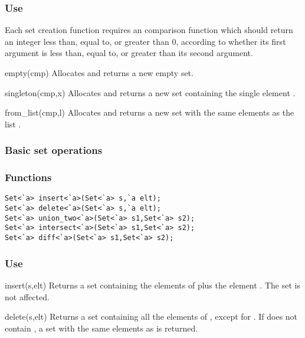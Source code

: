 \subsubsection*{Use}

Each set creation function requires an comparison function 
which should return an integer less than, equal to, or greater than 0,
according to whether its first argument is less than, equal to, or
greater than its second argument.

\begin{defun}{empty}{(cmp)}
Allocates and returns a new empty set.
\end{defun}

\begin{defun}{singleton}{(cmp,x)}
Allocates and returns a new set containing the single element .
\end{defun}

\begin{defun}{from_list}{(cmp,l)}
Allocates and returns a new set with the same elements as the list
.
\end{defun}

\subsubsection*{Basic set operations}
\subsubsection*{Functions}
\begin{verbatim}
Set<`a> insert<`a>(Set<`a> s,`a elt);
Set<`a> delete<`a>(Set<`a> s,`a elt);
Set<`a> union_two<`a>(Set<`a> s1,Set<`a> s2);
Set<`a> intersect<`a>(Set<`a> s1,Set<`a> s2);
Set<`a> diff<`a>(Set<`a> s1,Set<`a> s2);
\end{verbatim}

\subsubsection*{Use}

\begin{defun}{insert}{(s,elt)}
Returns a set containing the elements of  plus the element
.  The set  is not affected.
\end{defun}

\begin{defun}{delete}{(s,elt)}
Returns a set containing all the elements of , except for
.  If  does not contain , a set with the same
elements as  is returned.
\end{defun}

